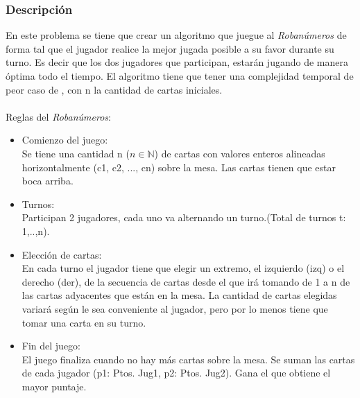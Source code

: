 \documentclass[11pt, a4paper, twoside]{article}
\begin{document}
{}

\subsubsection{Descripción} 

En este problema se tiene que crear un algoritmo que juegue al \textit{Robanúmeros} de forma tal 
que el jugador realice la mejor jugada posible a su favor durante su turno. Es decir que los dos jugadores que
participan, estarán jugando de manera óptima todo el tiempo. El algoritmo tiene que tener una complejidad temporal
de peor caso de , con n la cantidad de cartas iniciales.\\
\\
Reglas del \textit{Robanúmeros}: 
\begin{itemize}
	\item Comienzo del juego: \\
	Se tiene una cantidad n ($n \in \mathbb{N}$) de cartas con valores enteros alineadas
	horizontalmente (c1, c2, ..., cn) sobre la mesa. Las cartas tienen que estar boca arriba. 
	\item Turnos: \\
	Participan 2 jugadores, cada uno va alternando un turno.(Total de turnos t: 1,..,n).  
	\item Elección de cartas: \\
	En cada turno el jugador tiene que elegir un extremo, el izquierdo (izq) o el derecho (der), de 
	la secuencia de cartas desde el que irá tomando de 1 a n de las cartas adyacentes que están en la mesa. 
	La cantidad de cartas elegidas variará según le sea conveniente al jugador, pero por lo menos tiene que tomar una 
	carta en su turno. 
	\item Fin del juego: \\
	El juego finaliza cuando no hay más cartas sobre la mesa. Se suman las cartas de cada 
	jugador (p1: Ptos. Jug1, p2: Ptos. Jug2). Gana el que obtiene el mayor puntaje.
\end{itemize}
\end{document}
